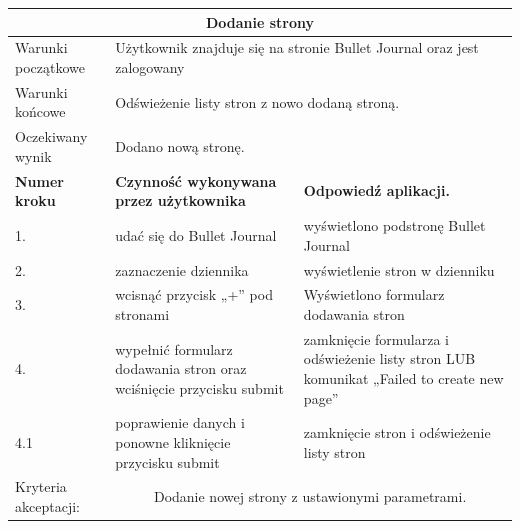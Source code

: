 \documentclass[a4paper,11pt]{report}
\begin{document}
\begin{table}[H]
	\centering
	\begin{tabular}{|p{2cm}|p{6cm}|p{6cm}|}
	\hline
	\multicolumn{3}{|c|}{\textbf{Dodanie strony}}\\
	\hline
	Warunki początkowe & \multicolumn{2}{|p{12cm}|}{Użytkownik znajduje się na stronie Bullet Journal oraz jest zalogowany}\\
	\hline
	Warunki końcowe & \multicolumn{2}{|p{12cm}|}{Odświeżenie listy stron z nowo dodaną stroną.}\\
	\hline
	Oczekiwany wynik & \multicolumn{2}{|p{12cm}|}{Dodano nową stronę.}\\
	\hline
	\textbf{Numer kroku} & \textbf{Czynność wykonywana przez użytkownika} & \textbf{Odpowiedź aplikacji.} \\
	\hline
	1. & udać się do Bullet Journal & wyświetlono podstronę Bullet Journal \\
	\hline
	2. & zaznaczenie dziennika & wyświetlenie stron w dzienniku \\
	\hline
	3. & wcisnąć przycisk „+” pod stronami & Wyświetlono formularz dodawania stron \\
	\hline
	4. & wypełnić formularz dodawania stron oraz wciśnięcie przycisku submit & zamknięcie formularza i odświeżenie listy stron LUB komunikat „Failed to create new page” \\
	\hline
	4.1 & poprawienie danych i ponowne kliknięcie przycisku submit & zamknięcie stron i odświeżenie listy stron \\
	\hline
	Kryteria akceptacji: & \multicolumn{2}{|c|}{Dodanie nowej strony z ustawionymi parametrami.} \\
	\hline
	\end{tabular}
\end{table}
\end{document}
